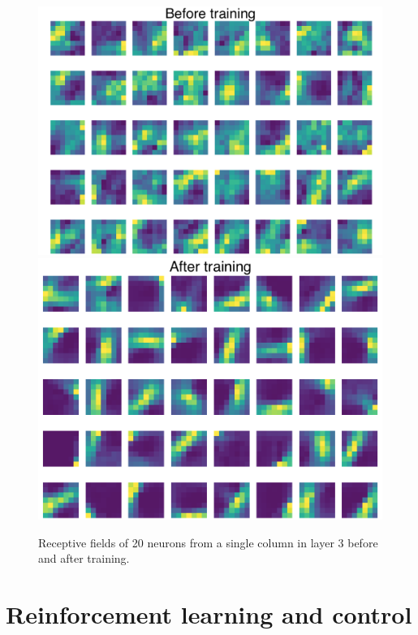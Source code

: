 \documentclass[12pt]{article}
\begin{document}
\begin{figure}[!htbp]
	\centering
	\includegraphics[width=12cm]{predictive_coding_stacked2_experiment3 before}
	\includegraphics[width=12cm]{predictive_coding_stacked2_experiment3 after}
	\caption{Receptive fields of 20 neurons from a single column in layer 3 before and after training.}
	\label{fig:experiment3}
\end{figure} 
 


\section{Reinforcement learning and control}
\end{document}
